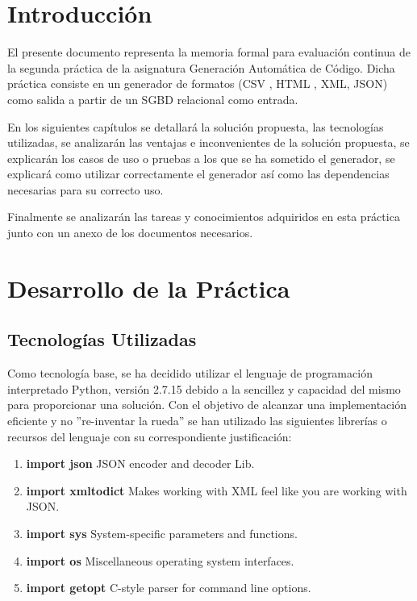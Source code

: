\documentclass[a4paper,11pt]{book}
\begin{document}


\tableofcontents
\listoffigures

%

%


\chapter{Introducción}

El presente documento representa la memoria formal para evaluación continua de la segunda práctica de la asignatura  Generación Automática de Código. Dicha práctica consiste en un generador de formatos (CSV , HTML , XML, JSON) como salida a partir de un SGBD relacional como entrada.  

En los siguientes capítulos se detallará la solución propuesta, las tecnologías utilizadas, se analizarán las ventajas e inconvenientes de la solución propuesta, se explicarán los casos de uso o pruebas a los que se ha sometido el generador, se explicará como utilizar correctamente el generador así como las dependencias necesarias para su correcto uso. 

Finalmente se analizarán las tareas y conocimientos adquiridos en esta práctica junto con un anexo de los documentos necesarios.   



\chapter{Desarrollo de la Práctica}

\section{Tecnologías Utilizadas}

Como tecnología base, se ha decidido utilizar el lenguaje de programación interpretado Python\cite{py}, versión 2.7.15 debido a la sencillez y capacidad del mismo para proporcionar una solución. Con el objetivo de alcanzar una implementación eficiente y no ''re-inventar la rueda'' se han utilizado las siguientes librerías o recursos del lenguaje con su correspondiente justificación: 

\begin{enumerate}
\item \textbf{import json} JSON encoder and decoder Lib\cite{json_lib}.
\item \textbf{import xmltodict} Makes working with XML feel like you are working with JSON\cite{xmltodic_lib}.
\item \textbf{import sys} System-specific parameters and functions\cite{sys_lib}.
\item \textbf{import os} Miscellaneous operating system interfaces\cite{os_lib}.
\item \textbf{import getopt} C-style parser for command line options\cite{getopt_lib}.
\end{enumerate}
\end{document}
